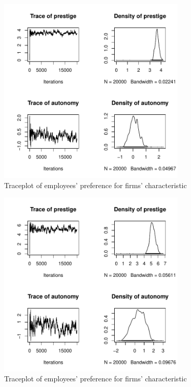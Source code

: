 \documentclass[12pt]{article}
\begin{document}
\begin{figure}[!ht]
\centering
\includegraphics[width=0.8\textwidth]{../figure/trace_alpha_adaptive_replicate2}
\caption{Traceplot of employees' preference for firms' characteristic}
\end{figure}

\begin{figure}[!ht]
\centering
\includegraphics[width=0.8\textwidth]{../figure/trace_alpha_adaptive_replicate3}
\caption{Traceplot of employees' preference for firms' characteristic}
\end{figure}
\end{document}
